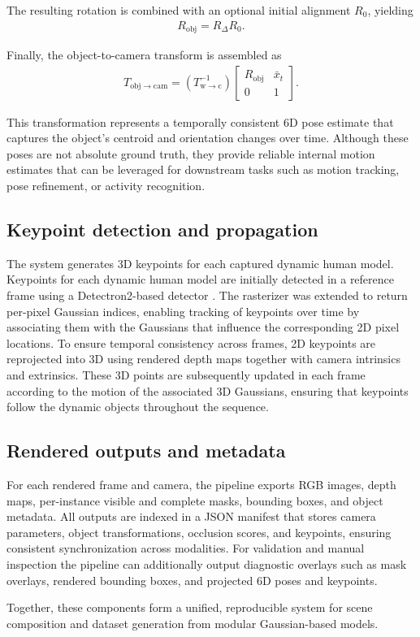 The resulting rotation is combined with an optional initial alignment $R_0$, yielding
\begin{align}
R_{\mathrm{obj}} = R_{\Delta} R_0.
\end{align}

Finally, the object-to-camera transform is assembled as
\begin{align}
T_{\mathrm{obj}\rightarrow\mathrm{cam}} =
\left(T_{\mathrm{w}\rightarrow\mathrm{c}}^{-1}\right)
\begin{bmatrix}
R_{\mathrm{obj}} & \bar{x}_{t} \\
0 & 1
\end{bmatrix}.
\end{align}

This transformation represents a temporally consistent 6D pose estimate 
that captures the object’s centroid and orientation changes over time. 
Although these poses are not absolute ground truth, 
they provide reliable internal motion estimates that can be leveraged 
for downstream tasks such as motion tracking, pose refinement, or activity recognition.



\subsection{Keypoint detection and propagation}
The system generates 3D keypoints for each captured dynamic human model. Keypoints for each dynamic human model are initially detected in a reference frame using a Detectron2-based detector \cite{Detectron22020}. The rasterizer was extended to return per-pixel Gaussian indices, enabling tracking of keypoints over time by associating them with the Gaussians that influence the corresponding 2D pixel locations. To ensure temporal consistency across frames, 2D keypoints are reprojected into 3D using rendered depth maps together with camera intrinsics and extrinsics. These 3D points are subsequently updated in each frame according to the motion of the associated 3D Gaussians, ensuring that keypoints follow the dynamic objects throughout the sequence.

\subsection{Rendered outputs and metadata}
For each rendered frame and camera, the pipeline exports RGB images, depth maps, per-instance visible and complete masks, bounding boxes, and object metadata.
All outputs are indexed in a JSON manifest that stores camera parameters, object transformations, occlusion scores, and keypoints, ensuring consistent synchronization across modalities.
For validation and manual inspection the pipeline can additionally output diagnostic overlays such as mask overlays, rendered bounding boxes, and projected 6D poses and keypoints.

\smallskip
Together, these components form a unified, reproducible system for scene composition and dataset generation from modular Gaussian-based models.
